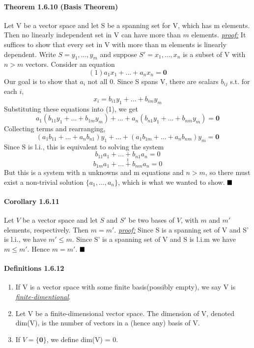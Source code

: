 \documentclass[11pt]{article}
\newcommand{\ti}[1]{\textit{#1}}
\newcommand{\tb}[1]{\textbf{#1}}
\newcommand{\under}[1]{\underline{#1}}
\newcommand{\proof}[0]{\textit{\underline{proof:} }}
\newcommand{\qed}[0]{$\hfill\blacksquare$}
\begin{document}
	\paragraph{Theorem 1.6.10 (Basis Theorem)} Let V be a vector space and let S be a spanning set for V, which has m elements. Then no linearly independent set in V can have more than $m$ elements.\newline \newline
	\ti{\under{proof:}} It suffices to show that every set in V with more than m elements is linearly dependent. Write $S = {y_1, ..., y_m}$ and suppose $S' = {x_1, ..., x_n}$ is a subset of V with $n >m$ vectors. Consider an equation
	$$(1)a_1x_1 + ... + a_nx_n = \tb{0}$$
	Our goal is to show that $a_i$ not all 0.
	Since S spans V, there are scalars $b_{ij}$ s.t. for each $i$,
	$$x_i = b_{i1}y_1 + ... +b_{im}y_m$$
	Substituting these equations into (1), we get $$a_1(b_{11}y_1+...+b_{1m}y_m)+...+a_n(b_{n1}y_1+...+b_{nm}y_m)=\tb{0}$$
	Collecting terms and rearranging,
	$$(a_1b_{11}+...+a_nb_{n1})y_1+...+(a_1b_{1m}+...+a_nb_{nm})y_m = \tb{0}$$
	Since S is l.i., this is equivalent to solving the system
	$$b_{11}a_1+...+b_{n1}a_n = 0$$
	$$.$$
	$$.$$
	$$.$$
	$$b_{1m}a_1+...+b_{nm}a_n=0$$
	But this is a system with n unknowns and m equations and $n>m$, so there must exist a non-trivial solution $\{a_1,...,a_n\}$, which is what we wanted to show. \qed
	\paragraph{Corollary 1.6.11} Let $V$ be a vector space and let $S$ and $S'$ be two bases of $V$, with $m$ and $m'$ elements, respectively. Then $m = m'$.\newline \newline
	\proof\newline
	Since S is a spanning set of V and S' is l.i., we have $m'\leq m$. Since S' is a spanning set of V and S is l.i.m we have $m \leq m'$. Hence $m = m'$. \qed
	\paragraph{Definitions 1.6.12}
	\begin{enumerate}
		\item If V is a vector space with some finite basis(possibly empty), we say V is \under{\it{finite-dimentional}}.
		\item Let V be a finite-dimensional vector space. The dimension of V, denoted dim(V), is the number of vectors in a (hence any) basis of V.
		\item If $V = \{\tb{0}\}$, we define dim(V) = 0.
	\end{enumerate}
\end{document}
